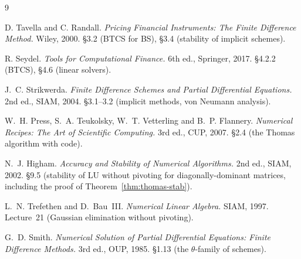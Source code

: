 \documentclass[11pt,a4paper]{article}
\begin{document}
\begin{thebibliography}{9}

D. Tavella and C. Randall.
\emph{Pricing Financial Instruments: The Finite Difference Method.}
Wiley, 2000. \S3.2 (BTCS for BS), \S3.4 (stability of implicit
schemes).

R. Seydel.
\emph{Tools for Computational Finance.}
6th ed., Springer, 2017. \S4.2.2 (BTCS), \S4.6 (linear solvers).

J.~C. Strikwerda.
\emph{Finite Difference Schemes and Partial Differential Equations.}
2nd ed., SIAM, 2004. \S3.1--3.2 (implicit methods, von Neumann
analysis).

W.~H. Press, S.~A. Teukolsky, W.~T. Vetterling and B.~P. Flannery.
\emph{Numerical Recipes: The Art of Scientific Computing.}
3rd ed., CUP, 2007. \S2.4 (the Thomas algorithm with code).

N.~J. Higham.
\emph{Accuracy and Stability of Numerical Algorithms.}
2nd ed., SIAM, 2002. \S9.5 (stability of LU without pivoting for
diagonally-dominant matrices, including the proof of
Theorem~\ref{thm:thomas-stab}).

L.~N. Trefethen and D.~Bau~III.
\emph{Numerical Linear Algebra.}
SIAM, 1997. Lecture~21 (Gaussian elimination without pivoting).

G.~D. Smith.
\emph{Numerical Solution of Partial Differential Equations:
Finite Difference Methods.}
3rd ed., OUP, 1985. \S1.13 (the $\theta$-family of schemes).

\end{thebibliography}
\end{document}
